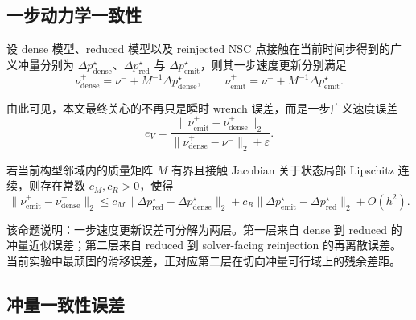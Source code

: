 \subsection{一步动力学一致性}

设 dense 模型、reduced 模型以及 reinjected NSC 点接触在当前时间步得到的广义冲量分别为 $\Delta p_{\mathrm{dense}}^\star$、$\Delta p_{\mathrm{red}}^\star$ 与 $\Delta p_{\mathrm{emit}}^\star$，则其一步速度更新分别满足
\begin{equation}
\nu_{\mathrm{dense}}^{+}
=
\nu^{-} + M^{-1}\Delta p_{\mathrm{dense}}^\star,
\qquad
\nu_{\mathrm{emit}}^{+}
=
\nu^{-} + M^{-1}\Delta p_{\mathrm{emit}}^\star.
\end{equation}

由此可见，本文最终关心的不再只是瞬时 wrench 误差，而是一步广义速度误差
\begin{equation}
e_V
=
\frac{\|\nu_{\mathrm{emit}}^{+}-\nu_{\mathrm{dense}}^{+}\|_2}
{\|\nu_{\mathrm{dense}}^{+}-\nu^{-}\|_2+\varepsilon}.
\end{equation}

\begin{proposition}
若当前构型邻域内的质量矩阵 $M$ 有界且接触 Jacobian 关于状态局部 Lipschitz 连续，则存在常数 $c_M,c_R>0$，使得
\begin{equation}
\|\nu_{\mathrm{emit}}^{+}-\nu_{\mathrm{dense}}^{+}\|_2
\le
c_M
\|\Delta p_{\mathrm{red}}^\star-\Delta p_{\mathrm{dense}}^\star\|_2
+
c_R
\|\Delta p_{\mathrm{emit}}^\star-\Delta p_{\mathrm{red}}^\star\|_2
+
O(h^2).
\end{equation}
\end{proposition}

该命题说明：一步速度更新误差可分解为两层。第一层来自 dense 到 reduced 的冲量近似误差；第二层来自 reduced 到 solver-facing reinjection 的再离散误差。当前实验中最顽固的滑移误差，正对应第二层在切向冲量可行域上的残余差距。

\subsection{冲量一致性误差}

